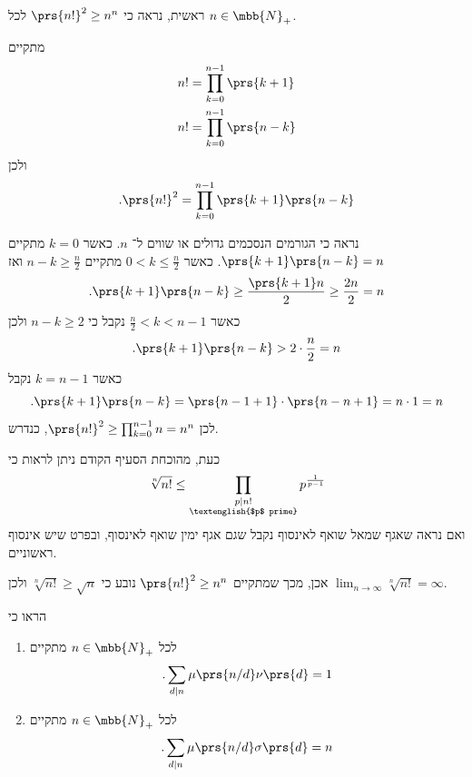\documentclass[a4paper,10pt,twoside,openany]{book}
\begin{document}
\begin{solution}
ראשית, נראה כי
$\prs{n!}^2 \geq n^n$
לכל
$n \in \mbb{N}_+$.

מתקיים
\begin{align*}
n! &= \prod_{k=0}^{n-1} \prs{k + 1} \\
n! &= \prod_{k=0}^{n-1} \prs{n - k}
\end{align*}
ולכן
\begin{align*}
\text{.} \prs{n!}^2 = \prod_{k=0}^{n-1} \prs{k+1}\prs{n-k}
\end{align*}

נראה כי הגורמים הנסכמים גדולים או שווים ל־%
$n$.
כאשר
$k = 0$
מתקיים
$\prs{k+1}\prs{n-k} = n$.
כאשר
$0 < k \leq \frac{n}{2}$
מתקיים
$n - k \geq \frac{n}{2}$
ואז
\[\text{.}\prs{k+1} \prs{n-k} \geq \frac{\prs{k+1} n}{2} \geq \frac{2n}{2} = n\]
כאשר
$\frac{n}{2} < k < n-1$
נקבל כי
$n - k \geq 2$
ולכן
\[\text{.} \prs{k+1}\prs{n-k} > 2 \cdot \frac{n}{2} = n\]
כאשר
$k = n-1$
נקבל
\[\text{.} \prs{k+1}\prs{n-k} = \prs{n-1+1} \cdot \prs{n-n+1} = n \cdot 1 = n\]
לכן
$\prs{n!}^2 \geq \prod_{k=0}^{n-1} n = n^n$,
כנדרש.

כעת, מהוכחת הסעיף הקודם ניתן לראות כי
\begin{align*}
\sqrt[n]{n!} \leq \prod_{\substack{p \mid n! \\ \text{\textenglish{$p$ prime}}}} p^{\frac{1}{p-1}}
\end{align*}
ואם נראה שאגף שמאל שואף לאינסוף נקבל שגם אגף ימין שואף לאינסוף, ובפרט שיש אינסוף ראשוניים.

אכן, מכך שמתקיים
$\prs{n!}^2 \geq n^n$
נובע כי
$\sqrt[n]{n!} \geq \sqrt{n}$
ולכן
$\lim_{n\to\infty}\sqrt[n]{n!} = \infty$.
\end{solution}

\begin{exercisechap}
הראו כי
\begin{enumerate}[label = (\alph*)]
\item לכל
$n \in \mbb{N}_+$
מתקיים
\[\text{.} \sum_{d \mid n} \mu\prs{n/d} \nu\prs{d} = 1\]
\item לכל
$n \in \mbb{N}_+$
מתקיים
\[\text{.} \sum_{d \mid n} \mu\prs{n/d} \sigma\prs{d} = n\]
\end{enumerate}
\end{exercisechap}
\end{document}
